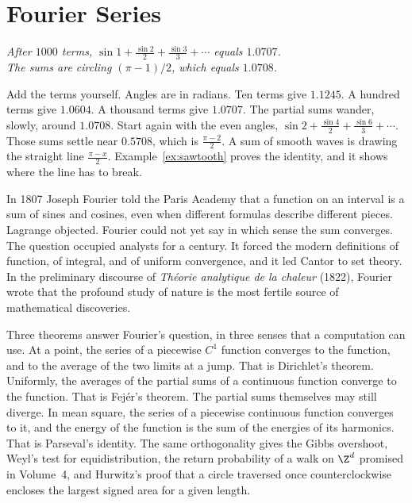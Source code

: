 \chapter{Fourier Series}\label{ch:fourier}

\begin{center}\itshape
After $1000$ terms, $\sin 1+\frac{\sin 2}2+\frac{\sin 3}3+\cdots$ equals $1.0707$.\\
The sums are circling $(\pi-1)/2$, which equals $1.0708$.
\end{center}

Add the terms yourself. Angles are in radians. Ten terms give $1.1245$. A hundred terms give $1.0604$. A thousand terms give $1.0707$. The partial sums wander, slowly, around $1.0708$. Start again with the even angles, $\sin 2+\frac{\sin 4}2+\frac{\sin 6}3+\cdots$. Those sums settle near $0.5708$, which is $\frac{\pi-2}2$. A sum of smooth waves is drawing the straight line $\frac{\pi-x}2$. Example~\ref{ex:sawtooth} proves the identity, and it shows where the line has to break.

In 1807 Joseph Fourier told the Paris Academy that a function on an interval is a sum of sines and cosines, even when different formulas describe different pieces. Lagrange objected. Fourier could not yet say in which sense the sum converges. The question occupied analysts for a century. It forced the modern definitions of function, of integral, and of uniform convergence, and it led Cantor to set theory. In the preliminary discourse of \emph{Th\'eorie analytique de la chaleur} (1822), Fourier wrote that the profound study of nature is the most fertile source of mathematical discoveries.


Three theorems answer Fourier's question, in three senses that a computation can use. At a point, the series of a piecewise $C^1$ function converges to the function, and to the average of the two limits at a jump. That is Dirichlet's theorem. Uniformly, the averages of the partial sums of a continuous function converge to the function. That is Fej\'er's theorem. The partial sums themselves may still diverge. In mean square, the series of a piecewise continuous function converges to it, and the energy of the function is the sum of the energies of its harmonics. That is Parseval's identity. The same orthogonality gives the Gibbs overshoot, Weyl's test for equidistribution, the return probability of a walk on $\Z^d$ promised in Volume~4, and Hurwitz's proof that a circle traversed once counterclockwise encloses the largest signed area for a given length.

